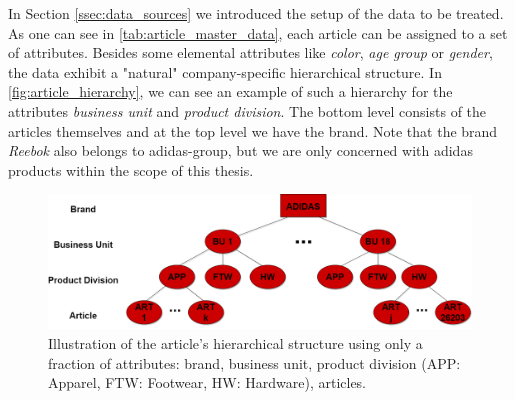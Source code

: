 
In Section \ref{ssec:data_sources} we introduced the setup of the data to be treated. As one can see in \autoref{tab:article_master_data}, each article can be assigned to a set of attributes. Besides some elemental attributes like \textit{color}, \textit{age group} or \textit{gender}, the data exhibit a "natural" company-specific hierarchical structure. In \autoref{fig:article_hierarchy}, we can see an example of such a hierarchy for the attributes \textit{business unit} and \textit{product division}. The bottom level consists of the articles themselves and at the top level we have the brand. Note that the brand \textit{Reebok} also belongs to adidas-group, but we are only concerned with adidas products within the scope of this thesis. 

\begin{figure}[H]
\centering
  \includegraphics[width=.95\linewidth]{figures/article_tree_white.png}
  \caption{Illustration of the article's hierarchical structure using only a fraction of attributes: brand, business unit, product division (APP: Apparel, FTW: Footwear, HW: Hardware), articles.}
  \label{fig:article_hierarchy}
\end{figure}






